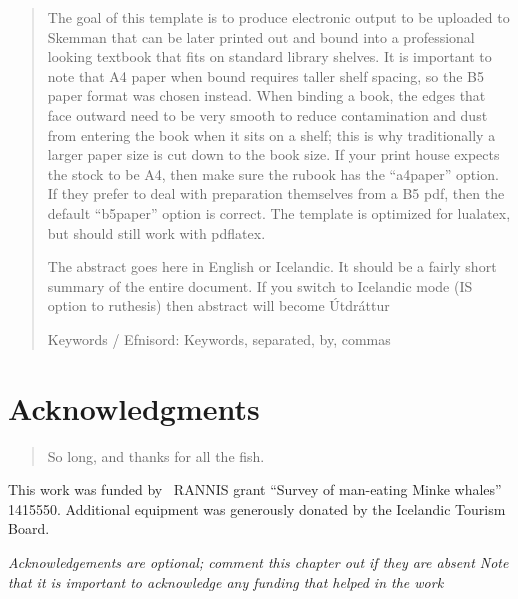 \documentclass[showtrims]{rubook}
\begin{document}
\begin{abstract}
  The goal of this template is to produce electronic output to be uploaded to Skemman that can be later printed out and bound into a professional looking textbook that fits on standard library shelves.
  It is important to note that A4 paper when bound requires taller shelf spacing, so the B5 paper format was chosen instead.
  When binding a book, the edges that face outward need to be very smooth to reduce contamination and dust from entering the book when it sits on a shelf; this is why traditionally a larger paper size is cut down to the book size.
  If your print house expects the stock to be A4, then make sure the rubook has the ``a4paper'' option.
  If they prefer to deal with preparation themselves from a B5 pdf, then the default ``b5paper'' option is correct.
  The template is optimized for lualatex, but should still work with pdflatex.
  
  The abstract goes here in English or Icelandic.
  It should be a fairly short summary of the entire document.
  If you switch to Icelandic mode (IS option to ruthesis) then abstract will become \'{U}tdr\'{a}ttur

  Keywords / Efnisord:  Keywords, separated, by, commas
\end{abstract}


\chapter*{Acknowledgments} 
\begin{quotation}
So long, and thanks for all the fish.
\end{quotation}
\vspace{\baselineskip}

This work was funded by \the\year~RANNIS grant ``Survey of man-eating Minke whales'' 1415550.
Additional equipment was generously donated by the Icelandic Tourism Board.

{\em Acknowledgements are optional; comment this chapter out if they are absent
  Note that it is important to acknowledge any funding that helped in the work\/}
\clearpage{}

\mainmatter{}

\end{document}
